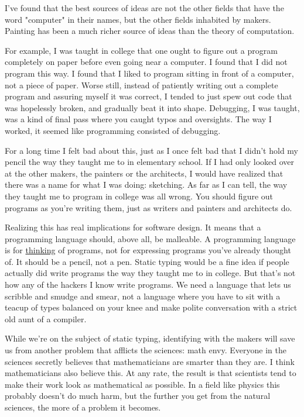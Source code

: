 I've found that the best sources of ideas
are not the other fields that have the word "computer" in
their names, but the other fields inhabited by makers.
Painting has been a much richer source of ideas than the
theory of computation.

For example, I was taught in college
that one ought to figure out a program
completely on paper
before even going near a computer.  I found that I did not
program this way.  I found that I liked to program
sitting in front of a computer, not a piece of paper.  Worse
still, instead of patiently writing out a complete program
and assuring myself it was correct, I tended to just spew
out code that was hopelessly broken, and gradually beat it into
shape.  Debugging, I was taught, was a kind of final pass where
you caught typos and oversights.  The way I worked, it
seemed like programming consisted of debugging.

For a long time I felt bad about this, just as I once
felt bad that I didn't hold my pencil the way they taught me
to in elementary school.
If I had only looked over at
the other makers, the painters or the architects, I would
have realized that there was a name for what I was doing:
sketching.  As far as I can tell, the
way they taught me to program in college was all wrong.
You should figure out programs as you're writing them,
just as writers and painters and architects do.

Realizing this has real implications for software design.
It means that a programming language should, above all, be
malleable.  A programming language is for 
\href{http://www.paulgraham.com/piraha.html}{thinking} of
programs, not for expressing programs you've already thought
of.  It should be a pencil, not a pen.  Static typing would
be a fine idea if people actually did write programs the way
they taught me to in college.  But that's not how any of the  
hackers I know write programs.  We need a language that lets us
scribble and smudge and smear, not a language where you have
to sit with a teacup of types balanced on your knee and make
polite conversation with a strict old aunt of a compiler.



While we're on the subject of static typing, identifying with
the makers will save us from another problem that afflicts
the sciences: math envy.  Everyone in the sciences
secretly believes that mathematicians are smarter than they are.  
I think mathematicians also believe this.  At any rate,
the result is that scientists tend to make their
work look as mathematical as possible.  In a field like
physics this probably doesn't do much harm, but the further you
get from the natural sciences, the more of a problem it
becomes.

